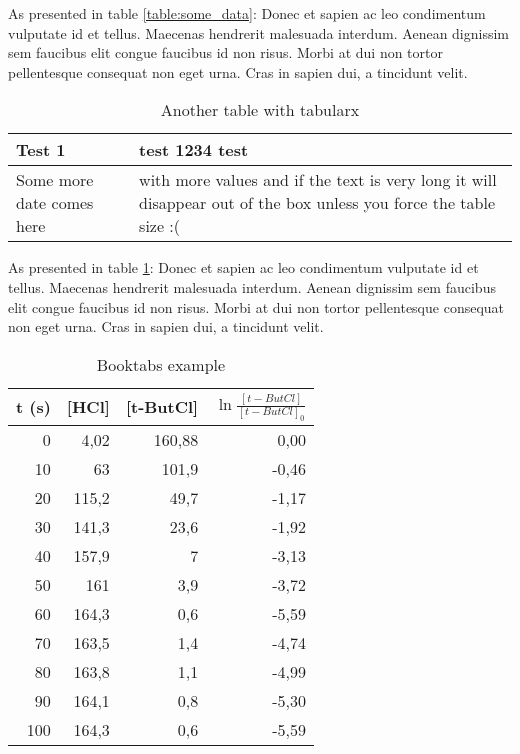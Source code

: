 As presented in table \ref{table:some_data}: Donec et sapien ac leo condimentum vulputate id et tellus. Maecenas hendrerit malesuada interdum. Aenean dignissim sem faucibus elit congue faucibus id non risus. Morbi at dui non tortor pellentesque consequat non eget urna. Cras in sapien dui, a tincidunt velit.

\begin{table}[h]
  \centering
  \caption{Another table with tabularx}
  \begin{tabularx}{.95\textwidth}{| l | >{\centering\arraybackslash} X |}
    \hline
    Test 1 & test 1234 test \\
    \hline
    Some more date comes here & with more values and if the text is very long it will disappear out of the box unless you force the table size :( \\
    \hline
  \end{tabularx}
  \label{table:some_data2}
\end{table}

As presented in table \ref{table:some_data2}: Donec et sapien ac leo condimentum vulputate id et tellus. Maecenas hendrerit malesuada interdum. Aenean dignissim sem faucibus elit congue faucibus id non risus. Morbi at dui non tortor pellentesque consequat non eget urna. Cras in sapien dui, a tincidunt velit.

\begin{table}[htbp]
  \centering
  \caption{Booktabs example}
    \begin{tabular}{rrrr}
    \toprule
    t (s) & [HCl] & [t-ButCl] & $\ln\frac{[t-ButCl]}{[t-ButCl]_0}$ \\
    \midrule
    0     & 4,02  & 160,88 & 0,00 \\
    10    & 63    & 101,9 & -0,46 \\
    20    & 115,2 & 49,7  & -1,17 \\
    30    & 141,3 & 23,6  & -1,92 \\
    40    & 157,9 & 7     & -3,13 \\
    50    & 161   & 3,9   & -3,72 \\
    60    & 164,3 & 0,6   & -5,59 \\
    70    & 163,5 & 1,4   & -4,74 \\
    80    & 163,8 & 1,1   & -4,99 \\
    90    & 164,1 & 0,8   & -5,30 \\
    100   & 164,3 & 0,6   & -5,59 \\
    \bottomrule
    \end{tabular}
  \label{tab:thisislabel}
\end{table}


